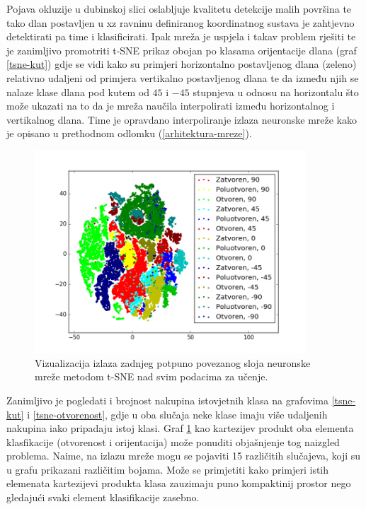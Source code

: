 \documentclass[times, utf8, diplomski, numeric]{fer}
\begin{document}
Pojava okluzije u dubinskoj slici oslabljuje kvalitetu detekcije malih površina te tako dlan postavljen u xz ravninu definiranog koordinatnog sustava je zahtjevno detektirati pa time i klasificirati. Ipak mreža je uspjela i takav problem rješiti te je zanimljivo promotriti t-SNE prikaz obojan po klasama orijentacije dlana (graf \ref{tsne-kut}) gdje se vidi kako su primjeri horizontalno postavljenog dlana (zeleno) relativno udaljeni od primjera vertikalno postavljenog dlana te da između njih se nalaze klase dlana pod kutem od $45$ i $-45$ stupnjeva u odnosu na horizontalu što može ukazati na to da je mreža naučila interpolirati između horizontalnog i vertikalnog dlana. Time je opravdano interpoliranje izlaza neuronske mreže kako je opisano u prethodnom odlomku (\ref{arhitektura-mreze}).


\begin{figure}[h!]
\centering
\includegraphics[width = 0.9\textwidth]{detekcija/train_all}
\caption{Vizualizacija izlaza zadnjeg potpuno povezanog sloja neuronske mreže metodom t-SNE nad svim podacima za učenje.} \label{tsne-all}
\end{figure}

Zanimljivo je pogledati i brojnost nakupina istovjetnih klasa na grafovima \ref{tsne-kut} i \ref{tsne-otvorenost}, gdje u oba slučaja neke klase imaju više udaljenih nakupina iako pripadaju istoj klasi. Graf \ref{tsne-all} kao kartezijev produkt oba elementa klasfikacije (otvorenost i orijentacija) može ponuditi objašnjenje tog naizgled problema. Naime, na izlazu mreže mogu se pojaviti 15 različitih slučajeva, koji su u grafu prikazani različitim bojama. Može se primjetiti kako primjeri istih elemenata kartezijevi produkta klasa zauzimaju puno kompaktinij prostor nego gledajući svaki element klasifikacije zasebno.
\end{document}
